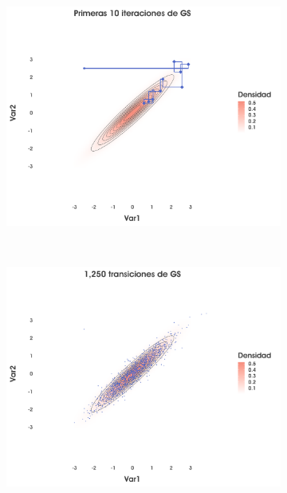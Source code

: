 \begin{figure}[h]
    \centering
    \begin{subfigure}{0.3\textwidth}
        \includegraphics[width=\textwidth]{Figs/Bayes/Ejemplo_GS_Compara1}
    \end{subfigure}
    ~
    \begin{subfigure}{0.3\textwidth}
        \includegraphics[width=\textwidth]{Figs/Bayes/Ejemplo_GS_Compara2}
    \end{subfigure}
    ~
    \begin{subfigure}{0.3\textwidth}

\end{subfigure}
\end{figure}
